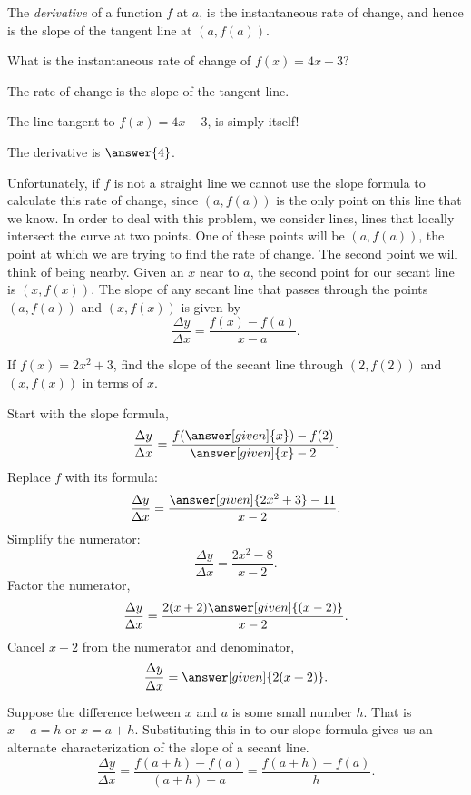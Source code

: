 \documentclass{ximera}
\begin{document}
The \textit{derivative} of a function $f$ at $a$, is the instantaneous
rate of change, and hence is the slope of the tangent line at $(a,f(a))$. 

\begin{question}
	What is the instantaneous rate of change of $f(x) = 4x-3$?
	\begin{hint}
		The rate of change is the slope of the tangent line.
	\end{hint}
	\begin{hint}
		The line tangent to $f(x) = 4x-3$, is simply itself!
	\end{hint}
	\begin{prompt}
		The derivative is $\answer{4}$.
	\end{prompt}
\end{question}


Unfortunately, if $f$ is not a straight line we cannot use the slope
formula to calculate this rate of change, since $(a,f(a))$ is the only
point on this line that we know.  In order to deal with this problem,
we consider  lines, lines that locally intersect the curve
at two points.  One of these points will be $(a, f(a))$, the point at
which we are trying to find the rate of change.  The second point we will
think of being nearby.  Given an $x$ near to $a$, the
second point for our secant line is $(x, f(x))$.  The slope of any
secant line that passes through the points $(a,f(a))$ and $(x,
f(x))$ is given by
\[
\frac{\Delta y}{\Delta x}=\frac{f(x) - f(a)}{x - a}.
\]

\begin{example}
	If $f(x) = 2x^2+3$, find the slope of the secant line through $(2,f(2))$
	and $(x,f(x))$ in terms of $x$.
	
	\begin{explanation}
		Start with the slope formula,
		\[
		\frac{\Delta y}{\Delta x} = \frac{f(\answer[given]{x})-f(2)}
		{\answer[given]{x} - 2}.
		\]
		Replace $f$ with its formula:
		\[
		\frac{\Delta y}{\Delta x} = \frac{\answer[given]{2x^2+3} - 11}{x-2}.
		\]
		Simplify the numerator:
		\[
		\frac{\Delta y}{\Delta x} = \frac{2x^2-8}{x-2}.
		\]
		Factor the numerator,
		\[
		\frac{\Delta y}{\Delta x} = \frac{2(x+2)\answer[given]{(x-2)}}{x-2}.
		\]
		Cancel $x-2$ from the numerator and denominator,
		\[
		\frac{\Delta y}{\Delta x} = \answer[given]{2(x+2)}.
		\]
	\end{explanation}
\end{example}

Suppose the difference between $x$ and $a$ is some small number $h$.  That
is $x-a=h$ or $x=a+h$.  Substituting this in to our slope formula gives us
an alternate characterization of the slope of a secant line.
\[
\frac{\Delta y}{\Delta x} = \frac{f(a+h)-f(a)}{(a+h)-a} = \frac{f(a+h)-f(a)}{h}.
\]
\end{document}

